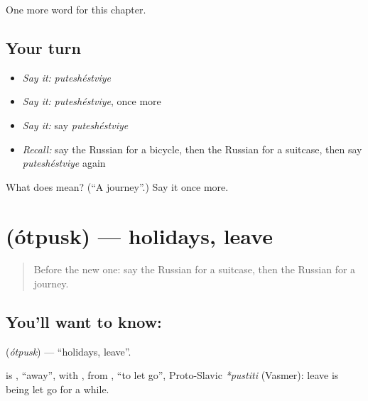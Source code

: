 \begin{grammarlens}[title={What you've built}]
One more word for this chapter.
\end{grammarlens}

\subsection*{Your turn}
\begin{itemize}
\raggedright
  \item \emph{Say it:} \emph{puteshéstviye}
  \item \emph{Say it:} \emph{puteshéstviye}, once more
  \item \emph{Say it:} say \emph{puteshéstviye}
  \item \emph{Recall:} say the Russian for a bicycle, then the Russian for a suitcase, then say \emph{puteshéstviye} again
\end{itemize}

\begin{tcolorbox}[breakable,colback=teal!4,colframe=teal!35!black,title={Before you move on}]
What does  mean? (\textquotedblleft{}A journey\textquotedblright{}.) Say it once more.
\end{tcolorbox}
\section[\texorpdfstring{\ru{отпуск} (ótpusk)}{отпуск (ótpusk)}]{ (ótpusk) — holidays, leave}

\label{lesson:RU-C92-holidays}



\begin{quote}
Before the new one: say the Russian for a suitcase, then the Russian for a journey.
\end{quote}

\subsection*{You'll want to know: }
\textbf{} (\emph{ótpusk}) — \textquotedblleft{}holidays, leave\textquotedblright{}.

\begin{cousinweb}
\textbf{} is \emph{}, \textquotedblleft{}away\textquotedblright{}, with \emph{}, from \emph{}, \textquotedblleft{}to let go\textquotedblright{}, Proto-Slavic \emph{*pustiti} (Vasmer): leave is being let go for a while.
\end{cousinweb}


